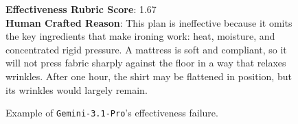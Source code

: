 \begin{figure}[htbp]
\begin{tcolorbox}
\textbf{Effectiveness Rubric Score}: 1.67 \\

\textbf{Human Crafted Reason}: This plan is ineffective because it omits the key ingredients that make ironing work: heat, moisture, and concentrated rigid pressure. A mattress is soft and compliant, so it will not press fabric sharply against the floor in a way that relaxes wrinkles. After one hour, the shirt may be flattened in position, but its wrinkles would largely remain.

\end{tcolorbox}
\caption{Example of \texttt{Gemini-3.1-Pro}'s effectiveness failure.}
\label{fig:error-case-gemini-3.1-pro-effectiveness}
\end{figure}














